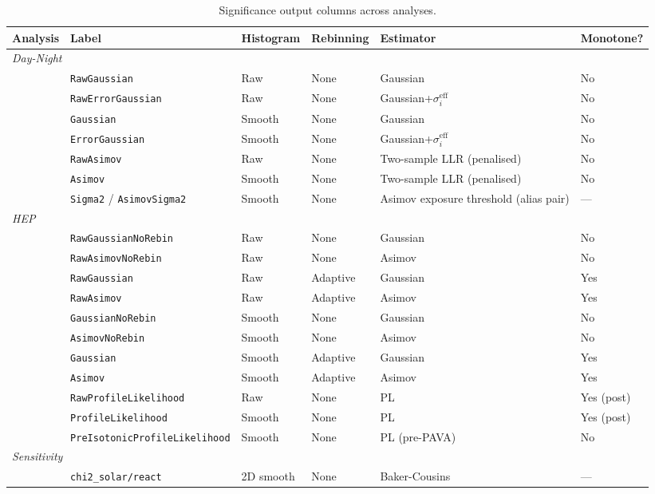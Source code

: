 \documentclass[12pt,a4paper]{article}
\newcommand{\seff}{\sigma^{\mathrm{eff}}_{i}} %
\begin{document}
\begin{table}[ht]
\centering
\caption{Significance output columns across analyses.}
\label{tab:methods}
\begin{tabular}{llllll}
\toprule
Analysis & Label & Histogram & Rebinning & Estimator & Monotone? \\
\midrule
\multicolumn{6}{l}{\textit{Day-Night}} \\
 & \texttt{RawGaussian}              & Raw    & None & Gaussian         & No \\
 & \texttt{RawErrorGaussian}         & Raw    & None & Gaussian+$\seff$ & No \\
 & \texttt{Gaussian}                 & Smooth & None & Gaussian         & No \\
 & \texttt{ErrorGaussian}            & Smooth & None & Gaussian+$\seff$ & No \\
 & \texttt{RawAsimov}                & Raw    & None & Two-sample LLR (penalised) & No \\
 & \texttt{Asimov}                   & Smooth & None & Two-sample LLR (penalised) & No \\
 & \texttt{Sigma2} / \texttt{AsimovSigma2}  & Smooth & None & Asimov exposure threshold (alias pair) & --- \\
\midrule
\multicolumn{6}{l}{\textit{HEP}} \\
 & \texttt{RawGaussianNoRebin}       & Raw    & None     & Gaussian & No \\
 & \texttt{RawAsimovNoRebin}         & Raw    & None     & Asimov   & No \\
 & \texttt{RawGaussian}              & Raw    & Adaptive & Gaussian & Yes \\
 & \texttt{RawAsimov}                & Raw    & Adaptive & Asimov   & Yes \\
 & \texttt{GaussianNoRebin}          & Smooth & None     & Gaussian & No \\
 & \texttt{AsimovNoRebin}            & Smooth & None     & Asimov   & No \\
 & \texttt{Gaussian}                 & Smooth & Adaptive & Gaussian & Yes \\
 & \texttt{Asimov}                   & Smooth & Adaptive & Asimov   & Yes \\
 & \texttt{RawProfileLikelihood}     & Raw    & None     & PL       & Yes (post) \\
 & \texttt{ProfileLikelihood}        & Smooth & None     & PL       & Yes (post) \\
 & \texttt{PreIsotonicProfileLikelihood}
   & Smooth & None & PL (pre-PAVA) & No \\
\midrule
\multicolumn{6}{l}{\textit{Sensitivity}} \\
 & \texttt{chi2\_solar/react} & 2D smooth & None & Baker-Cousins & --- \\
\bottomrule
\end{tabular}
\end{table}
\end{document}
